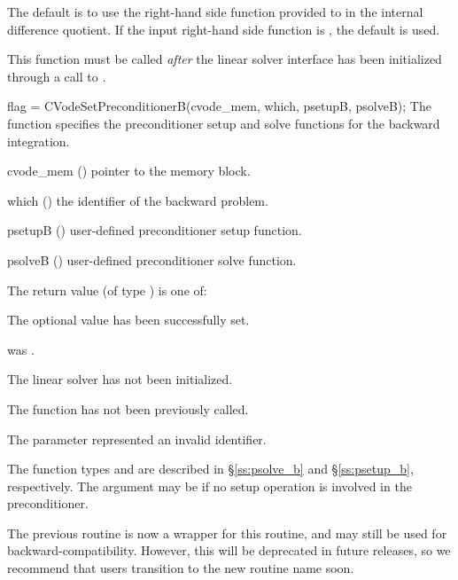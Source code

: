 {
  The default is to use the right-hand side function provided to 
  in the internal difference quotient. If the input right-hand side function is
  , the default is used.

  This function must be called \emph{after} the {\cvls} linear solver interface
  has been initialized through a call to .
}
{
  flag = CVodeSetPreconditionerB(cvode\_mem, which, psetupB, psolveB);
}
{
  The function  specifies the preconditioner
  setup and solve functions for the backward integration.
}
{
  \begin{args}[psetupB]
  \item[cvode\_mem] ()
    pointer to the {\cvodes} memory block.
  \item[which] ()
    the identifier of the backward problem.
  \item[psetupB] ()
    user-defined preconditioner setup function.
  \item[psolveB] ()
    user-defined preconditioner solve function.
  \end{args}
}
{
  The return value  (of type ) is one of:
  \begin{args}
  \item[\Id{CVLS\_SUCCESS}]
    The optional value has been successfully set.
  \item[\Id{CVLS\_MEM\_NULL}]
     was .
  \item[\Id{CVLS\_LMEM\_NULL}]
    The {\cvls} linear solver has not been initialized.
  \item[\Id{CVLS\_NO\_ADJ}]
    The function  has not been previously called.
  \item[\Id{CVLS\_ILL\_INPUT}]
    The parameter  represented an invalid identifier.
  \end{args}
}
{
  The function types  and  are
  described in \S\ref{ss:psolve_b} and \S\ref{ss:psetup_b}, respectively.
  The  argument may be  if no setup operation is involved
  in the preconditioner.

  The previous routine  is now a wrapper for this
  routine, and may still be used for backward-compatibility.  However,
  this will be deprecated in future releases, so we recommend that
  users transition to the new routine name soon.
}
